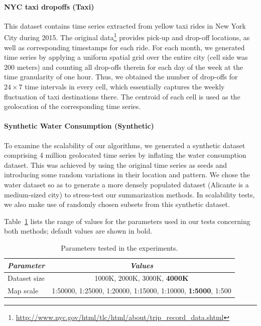 \paragraph{NYC taxi dropoffs (Taxi)} This dataset contains time series extracted from yellow taxi rides in New York City during 2015. The original data\footnote{\url{http://www.nyc.gov/html/tlc/html/about/trip_record_data.shtml}} provides pick-up and drop-off locations, as well as corresponding timestamps for each ride. For each month, we generated time series by applying a uniform spatial grid over the entire city (cell side was 200 meters) and counting all drop-offs therein for each day of the week at the time granularity of one hour. Thus, we obtained the number of drop-offs for $24 \times 7$ time intervals in every cell, which essentially captures the weekly fluctuation of taxi destinations there. The centroid of each cell is used as the geolocation of the corresponding time series.

\paragraph{Synthetic Water Consumption (Synthetic)} To examine the scalability of our algorithms, we generated a synthetic dataset comprising 4 million geolocated time series by inflating the water consumption dataset. This was achieved by using the original time series as seeds and introducing some random variations in their location and pattern. We chose the water dataset so as to generate a more densely populated dataset (Alicante is a medium-sized city) to stress-test our summarization methods. In scalability tests, we also make use of randomly chosen subsets from this synthetic dataset.

\vspace{2mm}

Table~\ref{tab:parameters1} lists the range of values for the parameters used in our tests concerning both methods; default values are shown in bold.

\vspace{-7.5pt}
\begin{table}[h]
\centering
\caption{Parameters tested in the experiments.}
\begin{footnotesize}
\begin{tabular}{lc} 
\hline
{\em Parameter} &{\em Values} \\
\hline
Dataset size & 1000K, 2000K, 3000K, {\bf 4000K} \\
Map scale & 1:50000, 1:25000, 1:20000, 1:15000, 1:10000, {\bf 1:5000}, 1:500 \\
\hline
\end{tabular}
\end{footnotesize}
\label{tab:parameters1}
\end{table}

